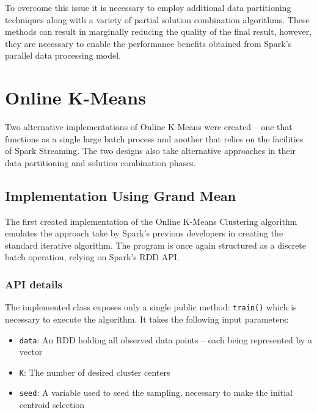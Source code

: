 \documentclass{l4proj}
\begin{document}
To overcome this issue it is necessary to employ additional data partitioning techniques along with a variety of partial solution combination algorithms. These methods can result in marginally reducing the quality of the final result, however, they are necessary to enable the performance benefits obtained from Spark's parallel data processing model.


\chapter{Online K-Means}
\label{online}

Two alternative implementations of Online K-Means were created -- one that functions as a single large batch process and another that relies on the facilities of Spark Streaming. The two designs also take alternative approaches in their data partitioning and solution combination phases.

\section{Implementation Using Grand Mean}

The first created implementation of the Online K-Means Clustering algorithm emulates the approach take by Spark's previous developers in creating the standard iterative algorithm. The program is once again structured as a discrete batch operation, relying on Spark's RDD API.

\subsection{API details}

The implemented class exposes only a single public method: \texttt{train()} which is necessary to execute the algorithm. It takes the following input parameters:

\begin{itemize}
\item \texttt{data}: An RDD holding all observed data points -- each being represented by a vector
\item \texttt{K}: The number of desired cluster centers
\item \texttt{seed}: A variable used to seed the sampling, necessary to make the initial centroid selection
\end{itemize}
\end{document}
